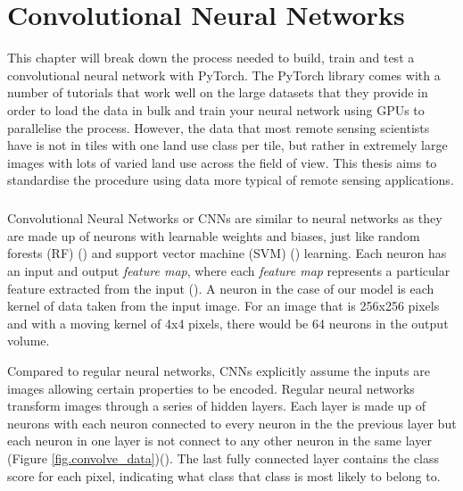 \chapter{Convolutional Neural Networks}
This chapter will break down the process needed to build, train and test a convolutional neural network with PyTorch. The PyTorch library comes with a number of tutorials that work well on the large datasets that they provide in order to load the data in bulk and train your neural network using GPUs to parallelise the process. However, the data that most remote sensing scientists have is not in tiles with one land use class per tile, but rather in extremely large images with lots of varied land use across the field of view. This thesis aims to standardise the procedure using data more typical of remote sensing applications.
\paragraph{}
Convolutional Neural Networks or CNNs are similar to neural networks as they are made up of neurons with learnable weights and biases, just like random forests (RF) (\cite{belgiu16,Breiman01}) and support vector machine (SVM) (\cite{cortes95,mountrakis11,vapnik82}) learning. Each neuron has an input and output \textit{feature map}, where each \textit{feature map} represents a particular feature extracted from the input (\cite{lecun10}). A neuron in the case of our model is each kernel of data taken from the input image. For an image that is 256x256 pixels and with a moving kernel of 4x4 pixels, there would be 64 neurons in the output volume. 
\par 
Compared to regular neural networks, CNNs explicitly assume the inputs are images allowing certain properties to be encoded. Regular neural networks transform images through a series of hidden layers. Each layer is made up of neurons with each neuron connected to every neuron in the the previous layer but each neuron in one layer is not connect to any other neuron in the same layer (Figure \ref{fig.convolve_data})(\cite{karpathy_cnn1}). The last fully connected layer contains the class score for each pixel, indicating what class that class is most likely to belong to. 
\par 
